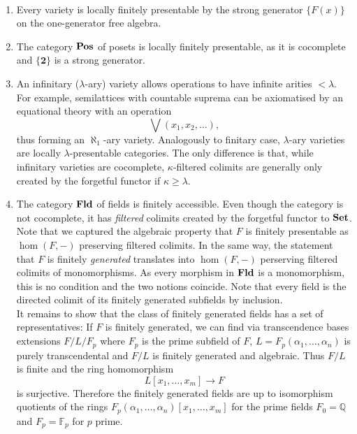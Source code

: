 \begin{Example}\
\begin{enumerate}
\item Every variety is locally finitely presentable by the strong generator $\{ F(x) \}$ on the one-generator free algebra.

\item The category $\mathbf{Pos}$ of posets is locally finitely presentable, as it is cocomplete and $\{\mathbf 2\}$ is a strong generator. 

\item An infinitary ($\lambda$-ary) variety allows operations to have infinite arities $< \lambda$. For example, semilattices with countable suprema can be axiomatised by an equational theory with an operation
\[ \bigvee(x_1, x_2, \ldots), \]
thus forming an $\aleph_1$-ary variety. Analogously to finitary case, $\lambda$-ary varieties are locally $\lambda$-presentable categories. The only difference is that, while infinitary varieties are cocomplete, $\kappa$-filtered colimits are generally only created by the forgetful functor if $\kappa \geq \lambda$.

\item The category $\mathbf{Fld}$ of fields is finitely accessible. Even though the category is not cocomplete, it has \emph{filtered} colimits created by the forgetful functor to $\mathbf{Set}$. \\

Note that we captured the algebraic property that $F$ is finitely presentable as $\hom(F,-)$ preserving filtered colimits. In the same way, the statement that $F$ is finitely \emph{generated} translates into $\hom(F,-)$ perserving filtered colimits of monomorphisms. As every morphism in $\mathbf{Fld}$ is a monomorphism, this is no condition and the two notions coincide. Note that every field is the directed colimit of its finitely generated subfields by inclusion. \\

It remains to show that the class of finitely generated fields has a set of representatives: If $F$ is finitely generated, we can find via transcendence bases extensions $F/L/F_p$ where $F_p$ is the prime subfield of $F$, $L=F_p(\alpha_1,\ldots,\alpha_n)$ is purely transcendental and $F/L$ is finitely generated and algebraic. Thus $F/L$ is finite and the ring homomorphism
\[ L[x_1,\ldots,x_m] \to F \]
is surjective. Therefore the finitely generated fields are up to isomorphism quotients of the rings $F_p(\alpha_1, \ldots,\alpha_n)[x_1,\ldots,x_m]$ for the prime fields $F_0 = \mathbb Q$ and $F_p = \mathbb F_p$ for $p$ prime.
\end{enumerate}
\end{Example}

